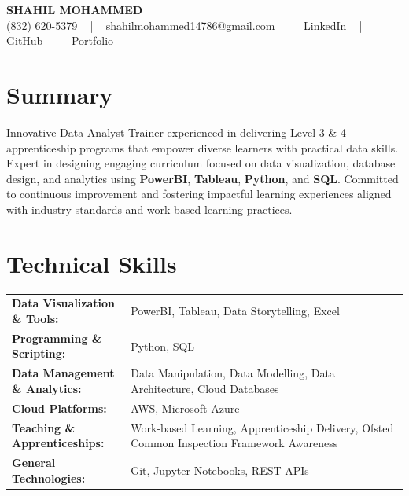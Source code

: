 \documentclass[letterpaper,11pt]{article}
\begin{document}
\begin{center}
    {\fontsize{14pt}{12pt}\selectfont \textbf{\MakeUppercase{Shahil Mohammed}}}\\ \vspace{2pt}
    \fontsize{10pt}{12pt}\selectfont (832) 620-5379 ~ | ~ \href{mailto:shahilmohammed14786@gmail.com}{shahilmohammed14786@gmail.com} ~ | ~  
    \href{https://www.linkedin.com/in/shahil-mohammed-9652931a1/}{\color{blue}\underline{LinkedIn}}  ~ | ~ 
    \href{https://github.com/freakbeast14}{\color{blue}\underline{GitHub}} ~ | ~ 
    \href{https://shahil-mohammed.netlify.app/}{\color{blue}\underline{Portfolio}}
    \vspace{-8pt}
\end{center}

\section{Summary}
\fontsize{9pt}{10pt}\selectfont
Innovative Data Analyst Trainer experienced in delivering Level 3 & 4 apprenticeship programs that empower diverse learners with practical data skills. Expert in designing engaging curriculum focused on data visualization, database design, and analytics using \textbf{PowerBI}, \textbf{Tableau}, \textbf{Python}, and \textbf{SQL}. Committed to continuous improvement and fostering impactful learning experiences aligned with industry standards and work-based learning practices.
 \vspace{-5pt}

\section{Technical Skills}
        \vspace{-14pt}
        \begin{table}[h]
            \fontsize{9pt}{10pt}\selectfont
            \begin{tabular}{p{0.3\linewidth} p{0.7\linewidth}}
                \textbf{Data Visualization \& Tools:} & PowerBI, Tableau, Data Storytelling, Excel \\
                \textbf{Programming \& Scripting:} & Python, SQL \\
                \textbf{Data Management \& Analytics:} & Data Manipulation, Data Modelling, Data Architecture, Cloud Databases \\
                \textbf{Cloud Platforms:} & AWS, Microsoft Azure \\
                \textbf{Teaching \& Apprenticeships:} & Work-based Learning, Apprenticeship Delivery, Ofsted Common Inspection Framework Awareness \\
                \textbf{General Technologies:} & Git, Jupyter Notebooks, REST APIs \\
            \end{tabular}
        \end{table}
 \vspace{-15pt}
 
\end{document}
